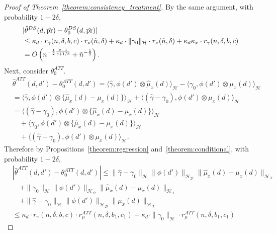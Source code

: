 \begin{proof}[Proof of Theorem~\ref{theorem:consistency_treatment}]
By the same argument, with probability $1-2\delta$,
    \begin{align*}
   &|\hat{\theta}^{DS}(d,\tilde{\text{\normalfont pr}})-\theta_0^{DS}(d,\tilde{\text{\normalfont pr}})| \\
    &\leq \kappa_d \cdot r_{\gamma}(n,\delta,b,c) \cdot r_{\nu}(\tilde{n},\delta)+\kappa_d\cdot\|\gamma_0\|_{\mathcal{H}} \cdot r_{\nu}(\tilde{n},\delta)+\kappa_d\kappa_x \cdot r_{\gamma}(n,\delta,b,c)\\
      &=O\left( n^{-\frac{1}{2}\frac{c-1}{c+1/b}}+\tilde{n}^{-\frac{1}{2}}\right).
    \end{align*}
    Next, consider $\theta_0^{ATT}$.
    \begin{align*}
        &\hat{\theta}^{ATT}(d,d')-\theta_0^{ATT}(d,d') =\langle \hat{\gamma} , \phi(d')\otimes \hat{\mu}_x(d) \rangle_{\mathcal{H}} - \langle \gamma_0 , \phi(d')\otimes \mu_x(d) \rangle_{\mathcal{H}} \\
        &=\langle \hat{\gamma} , \phi(d')\otimes\{\hat{\mu}_x(d)-\mu_x(d)\} \rangle_{\mathcal{H}} + \langle (\hat{\gamma}-\gamma_0), \phi(d') \otimes \mu_x(d) \rangle_{\mathcal{H}} \\
        &=\langle (\hat{\gamma}-\gamma_0), \phi(d')\otimes\{\hat{\mu}_x(d)-\mu_x(d)\} \rangle_{\mathcal{H}} \\
        &\quad + \langle \gamma_0, \phi(d')\otimes\{\hat{\mu}_x(d)-\mu_x(d)\} \rangle_{\mathcal{H}}\\
        &\quad +\langle (\hat{\gamma}-\gamma_0), \phi(d') \otimes \mu_x(d) \rangle_{\mathcal{H}}.
    \end{align*}
    Therefore by Propositions~\ref{theorem:regression} and~\ref{theorem:conditional}, with probability $1-2\delta$,
   \begin{align*}
       &|\hat{\theta}^{ATT}(d,d')-\theta_0^{ATT}(d,d')|
       \leq 
       \|\hat{\gamma}-\gamma_0\|_{\mathcal{H}}\|\phi(d')\|_{\mathcal{H}_{\mathcal{D}}} \|\hat{\mu}_x(d)-\mu_x(d)\|_{\mathcal{H}_{\mathcal{X}}}\\
       &\quad +\|\gamma_0\|_{\mathcal{H}}\|\phi(d')\|_{\mathcal{H}_{\mathcal{D}}}\|\hat{\mu}_x(d)-\mu_x(d)\|_{\mathcal{H}_{\mathcal{X}}} \\
       &\quad +
       \|\hat{\gamma}-\gamma_0\|_{\mathcal{H}}\|\phi(d')\|_{\mathcal{H}_{\mathcal{D}}} \|\mu_x(d)\|_{\mathcal{H}_{\mathcal{X}}}
      \\
      &\leq \kappa_d \cdot r_{\gamma}(n,\delta,b,c) \cdot r_{\mu}^{ATT}(n,\delta,b_1,c_1)+\kappa_d\cdot\|\gamma_0\|_{\mathcal{H}} \cdot r_{\mu}^{ATT}(n,\delta,b_1,c_1)

\end{align*}
\end{proof}
